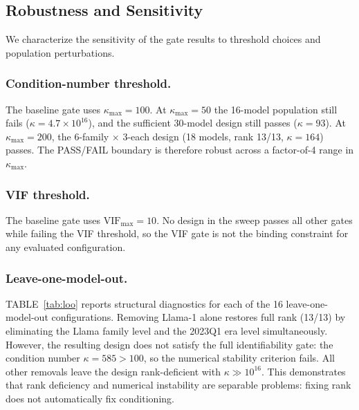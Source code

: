 \documentclass{ieeeaccess}
\theoremstyle{definition}
\theoremstyle{plain}
\begin{document}
\subsection{Robustness and Sensitivity}
We characterize the sensitivity of the gate results to threshold choices and population perturbations.

\subsubsection{Condition-number threshold.} The baseline gate uses $\kappa_{\max} = 100$. At $\kappa_{\max} = 50$ the 16-model population still fails ($\kappa = 4.7 \times 10^{16}$), and the sufficient 30-model design still passes ($\kappa = 93$). At $\kappa_{\max} = 200$, the 6-family $\times$ 3-each design (18 models, rank 13/13, $\kappa = 164$) passes. The PASS/FAIL boundary is therefore robust across a factor-of-4 range in $\kappa_{\max}$.

\subsubsection{VIF threshold.} The baseline gate uses $\text{VIF}_{\max} = 10$. No design in the sweep passes all other gates while failing the VIF threshold, so the VIF gate is not the binding constraint for any evaluated configuration.

\subsubsection{Leave-one-model-out.} TABLE~\ref{tab:loo} reports structural diagnostics for each of the 16 leave-one-model-out configurations. Removing Llama-1 alone restores full rank (13/13) by eliminating the Llama family level and the 2023Q1 era level simultaneously. However, the resulting design does not satisfy the full identifiability gate: the condition number $\kappa = 585 > 100$, so the numerical stability criterion fails. All other removals leave the design rank-deficient with $\kappa \gg 10^{16}$. This demonstrates that rank deficiency and numerical instability are separable problems: fixing rank does not automatically fix conditioning.
\end{document}

